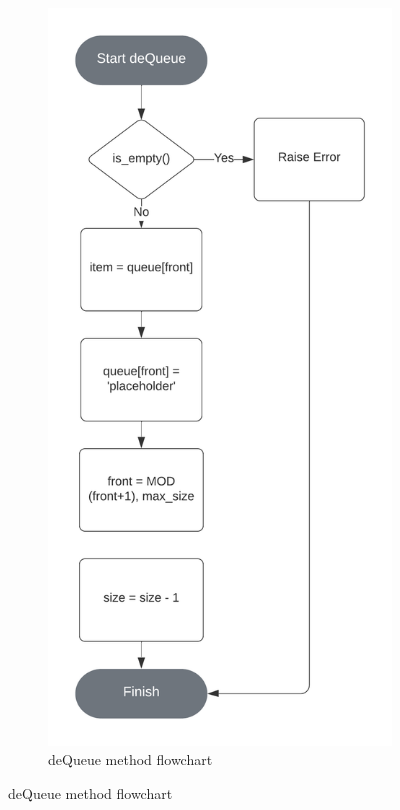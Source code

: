 \documentclass{article}
\begin{document}
\begin{figure}[ht]
\begin{subfigure}{.5\textwidth}
      \includegraphics[width=.8\linewidth]{deQueue-circular-queue-flowchart}
        \caption{deQueue method flowchart}
    \end{subfigure}


\end{figure}
\end{document}
